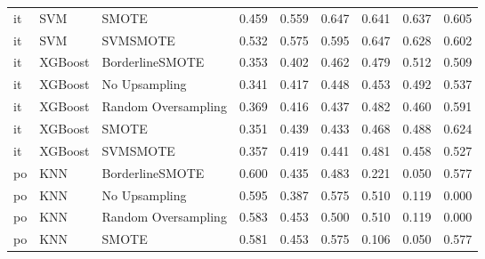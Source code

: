 \begin{tabular}{lllllllll}
      it &                          SVM &               SMOTE & 0.459 &                     0.559 &                 0.647 &                  0.641 &                                   0.637 &     0.605 \\
      it &                          SVM &            SVMSMOTE & 0.532 &                     0.575 &                 0.595 &                  0.647 &                                   0.628 &     0.602 \\
      it &                      XGBoost &     BorderlineSMOTE & 0.353 &                     0.402 &                 0.462 &                  0.479 &                                   0.512 &     0.509 \\
      it &                      XGBoost &       No Upsampling & 0.341 &                     0.417 &                 0.448 &                  0.453 &                                   0.492 &     0.537 \\
      it &                      XGBoost & Random Oversampling & 0.369 &                     0.416 &                 0.437 &                  0.482 &                                   0.460 &     0.591 \\
      it &                      XGBoost &               SMOTE & 0.351 &                     0.439 &                 0.433 &                  0.468 &                                   0.488 &     0.624 \\
      it &                      XGBoost &            SVMSMOTE & 0.357 &                     0.419 &                 0.441 &                  0.481 &                                   0.458 &     0.527 \\
      po &                          KNN &     BorderlineSMOTE & 0.600 &                     0.435 &                 0.483 &                  0.221 &                                   0.050 &     0.577 \\
      po &                          KNN &       No Upsampling & 0.595 &                     0.387 &                 0.575 &                  0.510 &                                   0.119 &     0.000 \\
      po &                          KNN & Random Oversampling & 0.583 &                     0.453 &                 0.500 &                  0.510 &                                   0.119 &     0.000 \\
      po &                          KNN &               SMOTE & 0.581 &                     0.453 &                 0.575 &                  0.106 &                                   0.050 &     0.577 \\

\end{tabular}
